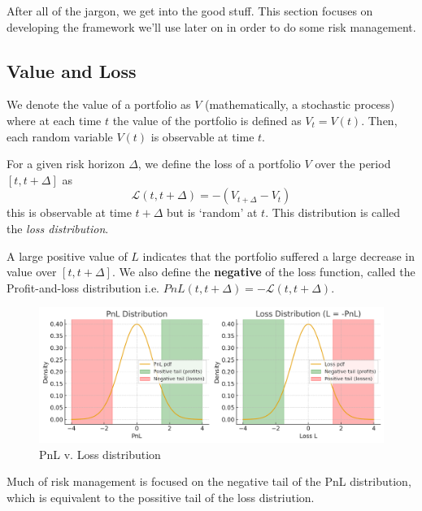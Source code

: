 After all of the jargon, we get into the good stuff. This section focuses on developing the framework we'll use later on in order to do some risk management.

\subsection*{Value and Loss}
We denote the value of a portfolio as $V$ (mathematically, a stochastic process) where at each time $t$ the value of the portfolio is defined as $V_t = V(t)$. Then,
each random variable $V(t)$ is observable at time $t$.

\begin{definition}
    For a given risk horizon $\Delta$, we define the loss of a portfolio $V$ over the period $ \left[ t, t + \Delta \right] $ as
    $$\mathcal{L}(t, t + \Delta) = - (V_{t + \Delta} - V_t)$$
    this is observable at time $t + \Delta$ but is `random' at $t$. This distribution is called the \textit{loss distribution}.
\end{definition}

\vspace{0.2cm}

A large positive value of $L$ indicates that the portfolio suffered a large decrease in value over $\left[ t, t + \Delta \right]$. We also define the \textbf{negative} of the loss function,
called the Profit-and-loss distribution i.e. $PnL(t, t + \Delta) = - \mathcal{L}(t, t + \Delta)$.

\begin{figure}[htbp]
\centerline{\includegraphics[scale=0.5]{figures/pnl_v_l_distributions.png}}
\caption{PnL v. Loss distribution}
\label{lossvpnl}
\end{figure}

\begin{remark}
    Much of risk management is focused on the negative tail of the PnL distribution, which is equivalent to the possitive tail of the loss distriution. 
\end{remark}

